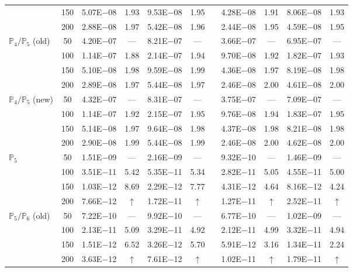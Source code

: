 \begin{table}[H]
{\begin{tabular}{@{}l c c c c c c c c c c@{}}
 & 150 & 5.07E$-$08 & 1.93  & 9.53E$-$08 & 1.95 &  & 4.28E$-$08 & 1.91 & 8.06E$-$08 & 1.93\\
 & 200 & 2.88E$-$08 & 1.97  & 5.42E$-$08 & 1.96 &  & 2.44E$-$08 & 1.95 & 4.59E$-$08 & 1.95\\
\midrule
\multirow{4}{*}{$\mathbb{P}_{4}/\mathbb{P}_{5}$ (old)}
 & 50 & 4.20E$-$07 & ---  & 8.21E$-$07 & --- &  & 3.66E$-$07 & --- & 6.95E$-$07 & ---\\
 & 100 & 1.14E$-$07 & 1.88  & 2.14E$-$07 & 1.94 &  & 9.70E$-$08 & 1.92 & 1.82E$-$07 & 1.93\\
 & 150 & 5.10E$-$08 & 1.98  & 9.59E$-$08 & 1.99 &  & 4.36E$-$08 & 1.97 & 8.19E$-$08 & 1.98\\
 & 200 & 2.89E$-$08 & 1.97  & 5.44E$-$08 & 1.97 &  & 2.46E$-$08 & 2.00 & 4.61E$-$08 & 2.00\\
\midrule
\multirow{4}{*}{$\mathbb{P}_{4}/\mathbb{P}_{5}$ (new)}
 & 50 & 4.32E$-$07 & ---  & 8.31E$-$07 & --- &  & 3.75E$-$07 & --- & 7.09E$-$07 & ---\\
 & 100 & 1.14E$-$07 & 1.92  & 2.15E$-$07 & 1.95 &  & 9.76E$-$08 & 1.94 & 1.83E$-$07 & 1.95\\
 & 150 & 5.14E$-$08 & 1.97  & 9.64E$-$08 & 1.98 &  & 4.37E$-$08 & 1.98 & 8.21E$-$08 & 1.98\\
 & 200 & 2.90E$-$08 & 1.99  & 5.44E$-$08 & 1.99 &  & 2.46E$-$08 & 2.00 & 4.62E$-$08 & 2.00\\
\midrule
%
\multirow{4}{*}{$\mathbb{P}_{5}$}
 & 50 & 1.51E$-$09 & ---  & 2.16E$-$09 & --- &  & 9.32E$-$10 & --- & 1.46E$-$09 & ---\\
 & 100 & 3.51E$-$11 & 5.42  & 5.35E$-$11 & 5.34 &  & 2.82E$-$11 & 5.05 & 4.55E$-$11 & 5.00\\
 & 150 & 1.03E$-$12 & 8.69  & 2.29E$-$12 & 7.77 &  & 4.31E$-$12 & 4.64 & 8.16E$-$12 & 4.24\\
 & 200 & 7.66E$-$12 & $\uparrow$  & 1.72E$-$11 & $\uparrow$ &  & 1.27E$-$11 & $\uparrow$ & 2.52E$-$11 & $\uparrow$\\
\midrule
\multirow{4}{*}{$\mathbb{P}_{5}/\mathbb{P}_{6}$ (old)}
 & 50 & 7.22E$-$10 & ---  & 9.92E$-$10 & --- &  & 6.77E$-$10 & --- & 1.02E$-$09 & ---\\
 & 100 & 2.13E$-$11 & 5.09  & 3.29E$-$11 & 4.92 &  & 2.12E$-$11 & 4.99 & 3.32E$-$11 & 4.94\\
 & 150 & 1.51E$-$12 & 6.52  & 3.26E$-$12 & 5.70 &  & 5.91E$-$12 & 3.16 & 1.34E$-$11 & 2.24\\
 & 200 & 3.63E$-$12 & $\uparrow$  & 7.61E$-$12 & $\uparrow$ &  & 1.02E$-$11 & $\uparrow$ & 1.79E$-$11 & $\uparrow$\\

\end{tabular}}
\end{table}
